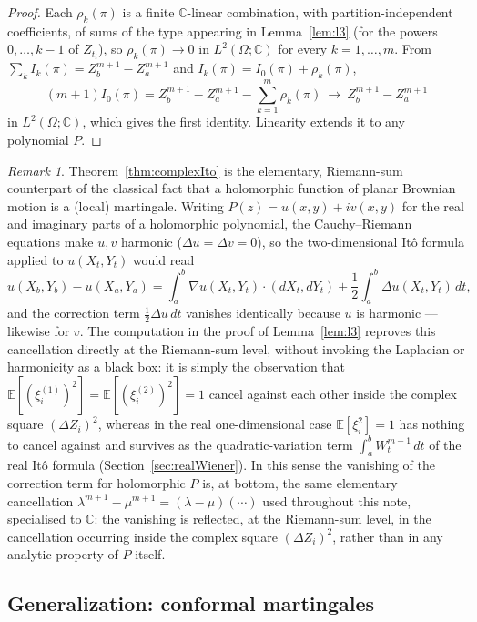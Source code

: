 \documentclass[11pt,fleqn]{article}
\def\C{\mathbb C}
\def\E{\mathbb E}
\theoremstyle{plain}
\theoremstyle{remark}
\newtheorem{remark}[thm]{Remark}
\begin{document}
\begin{proof}
Each $\rho_k(\pi)$ is a finite $\C$-linear combination, with
partition-independent coefficients, of sums of the type appearing in
Lemma~\ref{lem:l3} (for the powers $0,\ldots,k-1$ of $Z_{t_i}$), so
$\rho_k(\pi)\to0$ in $L^2(\Omega;\C)$ for every $k=1,\ldots,m$. From
$\sum_kI_k(\pi)=Z_b^{m+1}-Z_a^{m+1}$ and $I_k(\pi)=I_0(\pi)+\rho_k(\pi)$,
\[
(m+1)I_0(\pi)=Z_b^{m+1}-Z_a^{m+1}-\sum_{k=1}^m\rho_k(\pi)\ \longrightarrow\
Z_b^{m+1}-Z_a^{m+1}
\]
in $L^2(\Omega;\C)$, which gives the first identity. Linearity extends it
to any polynomial $P$.
\end{proof}

\begin{remark}
Theorem~\ref{thm:complexIto} is the elementary, Riemann-sum counterpart of
the classical fact that a holomorphic function of planar Brownian motion
is a (local) martingale. Writing $P(z)=u(x,y)+iv(x,y)$ for the real and
imaginary parts of a holomorphic polynomial, the Cauchy--Riemann equations
make $u,v$ harmonic ($\Delta u=\Delta v=0$), so the two-dimensional
It\^o formula applied to $u(X_t,Y_t)$ would read
\[
u(X_b,Y_b)-u(X_a,Y_a)=\int_a^b\nabla u(X_t,Y_t)\cdot(dX_t,dY_t)
+\frac12\int_a^b\Delta u(X_t,Y_t)\,dt,
\]
and the correction term $\frac12\Delta u\,dt$ vanishes identically because
$u$ is harmonic — likewise for $v$. The computation in the proof of
Lemma~\ref{lem:l3} reproves this cancellation directly at the Riemann-sum
level, without invoking the Laplacian or harmonicity as a black box: it is
simply the observation that $\E[(\xi_i^{(1)})^2]=\E[(\xi_i^{(2)})^2]=1$
cancel against each other inside the complex square $(\Delta Z_i)^2$,
whereas in the real one-dimensional case $\E[\xi_i^2]=1$ has nothing to
cancel against and survives as the quadratic-variation term
$\int_a^bW_t^{m-1}\,dt$ of the real It\^o formula
(Section~\ref{sec:realWiener}). In this
sense the vanishing of the correction term for holomorphic $P$ is, at
bottom, the same elementary cancellation
$\lambda^{m+1}-\mu^{m+1}=(\lambda-\mu)(\cdots)$ used throughout this note,
specialised to $\C$: the vanishing is reflected, at the Riemann-sum
level, in the cancellation occurring inside the complex square
$(\Delta Z_i)^2$, rather than in any analytic property of $P$ itself.
\end{remark}

\subsection{Generalization: conformal martingales}
\end{document}
